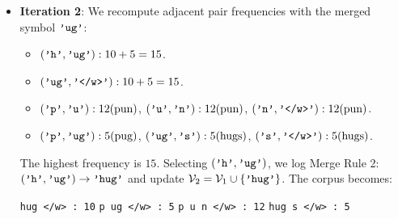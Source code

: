 \documentclass[../../main.tex]{subfiles}
\begin{document}
\begin{itemize}
    \item \textbf{Iteration 2}: We recompute adjacent pair frequencies with the merged symbol $\text{\texttt{'ug'}}$:
    \begin{itemize}
        \item $(\text{\texttt{'h'}}, \text{\texttt{'ug'}}): 10 + 5 = 15$.
        \item $(\text{\texttt{'ug'}}, \text{\texttt{'</w>'}}): 10 + 5 = 15$.
        \item $(\text{\texttt{'p'}}, \text{\texttt{'u'}}): 12 (\text{pun})$, \quad $(\text{\texttt{'u'}}, \text{\texttt{'n'}}): 12 (\text{pun})$, \quad $(\text{\texttt{'n'}}, \text{\texttt{'</w>'}}): 12 (\text{pun})$.
        \item $(\text{\texttt{'p'}}, \text{\texttt{'ug'}}): 5 (\text{pug})$, \quad $(\text{\texttt{'ug'}}, \text{\texttt{'s'}}): 5 (\text{hugs})$, \quad $(\text{\texttt{'s'}}, \text{\texttt{'</w>'}}): 5 (\text{hugs})$.
    \end{itemize}
    The highest frequency is $15$. Selecting $(\text{\texttt{'h'}}, \text{\texttt{'ug'}})$, we log Merge Rule 2: $(\text{\texttt{'h'}}, \text{\texttt{'ug'}}) \to \text{\texttt{'hug'}}$ and update $\mathcal{V}_2 = \mathcal{V}_1 \cup \{\text{\texttt{'hug'}}\}$.
    The corpus becomes:
    \begin{center}
    \texttt{hug </w> : 10} \qquad \texttt{p ug </w> : 5} \qquad \texttt{p u n </w> : 12} \qquad \texttt{hug s </w> : 5}
    \end{center}
\end{itemize}
\end{document}
